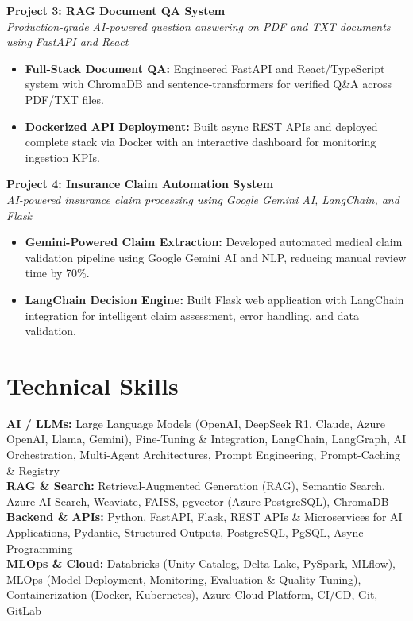 \documentclass[a4paper,10pt]{article}
\begin{document}
\vspace{6pt}

\noindent
\textbf{\color{projecttitle}Project 3: RAG Document QA System} \\
\textit{\small Production-grade AI-powered question answering on PDF and TXT documents using FastAPI and React}
\begin{itemize}
    \item \textbf{Full-Stack Document QA:} Engineered FastAPI and React/TypeScript system with ChromaDB and sentence-transformers for verified Q\&A across PDF/TXT files.
    \item \textbf{Dockerized API Deployment:} Built async REST APIs and deployed complete stack via Docker with an interactive dashboard for monitoring ingestion KPIs.
\end{itemize}

\vspace{6pt}

\noindent
\textbf{\color{projecttitle}Project 4: Insurance Claim Automation System} \\
\textit{\small AI-powered insurance claim processing using Google Gemini AI, LangChain, and Flask}
\begin{itemize}
    \item \textbf{Gemini-Powered Claim Extraction:} Developed automated medical claim validation pipeline using Google Gemini AI and NLP, reducing manual review time by 70\%.
    \item \textbf{LangChain Decision Engine:} Built Flask web application with LangChain integration for intelligent claim assessment, error handling, and data validation.
\end{itemize}

\section{Technical Skills}
\vspace{2pt}
\small
\textbf{AI / LLMs:} Large Language Models (OpenAI, DeepSeek R1, Claude, Azure OpenAI, Llama, Gemini), Fine-Tuning \& Integration, LangChain, LangGraph, AI Orchestration, Multi-Agent Architectures, Prompt Engineering, Prompt-Caching \& Registry \\[3.5pt]
\textbf{RAG \& Search:} Retrieval-Augmented Generation (RAG), Semantic Search, Azure AI Search, Weaviate, FAISS, pgvector (Azure PostgreSQL), ChromaDB \\[3.5pt]
\textbf{Backend \& APIs:} Python, FastAPI, Flask, REST APIs \& Microservices for AI Applications, Pydantic, Structured Outputs, PostgreSQL, PgSQL, Async Programming \\[3.5pt]
\textbf{MLOps \& Cloud:} Databricks (Unity Catalog, Delta Lake, PySpark, MLflow), MLOps (Model Deployment, Monitoring, Evaluation \& Quality Tuning), Containerization (Docker, Kubernetes), Azure Cloud Platform, CI/CD, Git, GitLab
\end{document}
